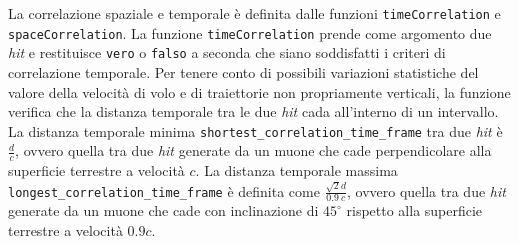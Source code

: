 \documentclass[../main.tex]{subfiles}
\begin{document}
La correlazione spaziale e temporale è definita dalle funzioni \texttt{timeCorrelation} e \texttt{spaceCorrelation}.
La funzione \texttt{timeCorrelation} prende come argomento due \emph{hit} e restituisce \texttt{vero} o \texttt{falso} a seconda che siano soddisfatti i criteri di correlazione temporale.
Per tenere conto di possibili variazioni statistiche del valore della velocità di volo e di traiettorie non propriamente verticali, la funzione verifica che la distanza temporale tra le due \emph{hit} cada all'interno di un intervallo.
La distanza temporale minima \texttt{shortest\_correlation\_time\_frame} tra due \emph{hit} è $\frac{d}{c}$, ovvero quella tra due \emph{hit} generate da un muone che cade perpendicolare alla superficie terrestre a velocità $c$.
La distanza temporale massima \texttt{longest\_correlation\_time\_frame} è definita come $\frac{\sqrt{2}d}{0.9\ c}$, ovvero quella tra due \emph{hit} generate da un muone che cade con inclinazione di $45^\circ$ rispetto alla superficie terrestre a velocità $0.9c$.


\end{document}

